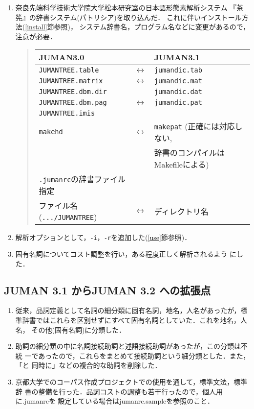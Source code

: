 \documentclass[a4j,titlepage]{jarticle}
\begin{document}
\begin{enumerate}
\item 奈良先端科学技術大学院大学松本研究室の日本語形態素解析システム
  『茶筅』の辞書システム(パトリシア)を取り込んだ．
  これに伴いインストール方法(\ref{install}節参照)，
  システム辞書名，プログラム名などに変更があるので，注意が必要．
  \begin{quote}
  \begin{tabular}{lll} \hline
    JUMAN3.0 & & JUMAN3.1 \\ \hline \hline
    {\tt JUMANTREE.table} & $\leftrightarrow$ & {\tt jumandic.tab} \\ \hline
    {\tt JUMANTREE.matrix} & $\leftrightarrow$ & {\tt jumandic.mat} \\ \hline
    {\tt JUMANTREE.dbm.dir} &  & {\tt jumandic.dat} \\ 
    {\tt JUMANTREE.dbm.pag} & $\leftrightarrow$ & {\tt jumandic.pat} \\ 
    {\tt JUMANTREE.imis} & \\ \hline
    {\tt makehd} & $\leftrightarrow$ & {\tt makepat} (正確には対応しない, \\
    & & 辞書のコンパイルはMakefileによる) \\ \hline
    {\tt .jumanrc}の辞書ファイル指定 \\
    ファイル名({\tt .../JUMANTREE}) & $\leftrightarrow$ & 
    ディレクトリ名 \\ \hline
  \end{tabular}
  \end{quote}
\item 解析オプションとして，{\tt -i}，{\tt -r}を追加した(\ref{use}節参照)．
\item 固有名詞についてコスト調整を行い，ある程度正しく解析されるよう
  にした．
\end{enumerate}

\subsection{JUMAN 3.1 からJUMAN 3.2 への拡張点}

\begin{enumerate}
\item 
従来，品詞定義として名詞の細分類に固有名詞，地名，人名があったが，標
準辞書ではこれらを区別せずにすべて固有名詞としていた．これを地名，人名，
その他(固有名詞)に分類した．

\item 
助詞の細分類の中に名詞接続助詞と述語接続助詞があったが，この分類は不統
一であったので，これらをまとめて接続助詞という細分類とした．また，「と
同時に」などの複合的な助詞を削除した．

\item 
京都大学でのコーパス作成プロジェクトでの使用を通して，標準文法，標準辞
書の整備を行った．品詞コストの調整も若干行ったので，個人用に.jumanrcを
設定している場合はjumanrc.sampleを参照のこと．

\end{enumerate}
\end{document}
